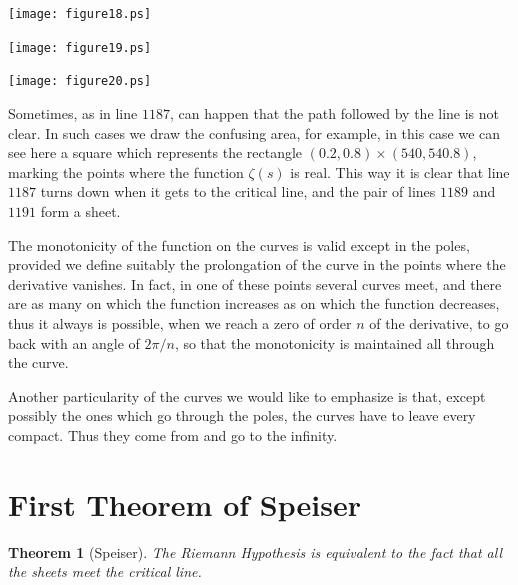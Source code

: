 \documentclass[a4paper]{amsart}
\newtheorem{Teorema}{Theorem}
\numberwithin{equation}{section}
\begin{document}
\begin{minipage}{61.6pt}
\texttt{[image: figure18.ps]}
\end{minipage}\hfil
\begin{minipage}{60.8pt}
\texttt{[image: figure19.ps]}
\end{minipage}\hfil
\begin{minipage}{171.64125pt}
\begin{minipage}{171.64125pt}
\texttt{[image: figure20.ps]}
\medskip

\begin{minipage}{171.64125pt}
    Sometimes, as in line $1187$, can happen that the path followed by the line is
not clear. In such cases we draw the confusing area, for example, in this case
we can see here a square which represents the rectangle $(0.2, 0.8)\times (540,
540.8)$, marking the points where the function $\zeta(s)$ is real. This way it
is clear that line $1187$ turns down when it gets to the critical line, and the
pair of lines $1189$ and $1191$ form a sheet.
\bigskip

The monotonicity of the function on the curves is valid except in the poles,
provided we define suitably the prolongation of the curve in the points where
the derivative vanishes. In fact, in one of these points several curves meet,
and there are as many on which the function increases as on which the function
decreases, thus it always is possible, when we reach a zero of order $n$ of the
derivative, to go back with an angle of $2\pi/n$, so that the 
monotonicity is
maintained all through the curve.
\bigskip

Another particularity of the curves we would like to emphasize is that,
except possibly the ones which go through the poles, the curves have to
leave every compact. Thus they come from and go to the infinity.
\end{minipage}
\end{minipage}
\end{minipage}


\section{First Theorem of Speiser}

\begin{Teorema}[Speiser]
The Riemann Hypothesis is equivalent to the fact that
all the sheets meet the critical line.
\end{Teorema}
\end{document}
